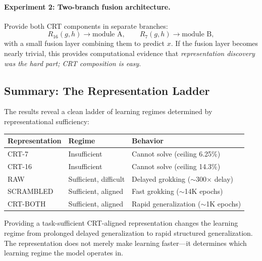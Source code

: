 \paragraph{Experiment 2: Two-branch fusion architecture.}
Provide both CRT components in separate branches:
\[
    R_{16}(g, h) \to \text{module A}, \qquad
    R_7(g, h) \to \text{module B},
\]
with a small fusion layer combining them to predict $x$. If the fusion layer becomes nearly trivial, this provides computational evidence that \emph{representation discovery was the hard part; CRT composition is easy}.


\subsection{Summary: The Representation Ladder}
\label{sec:repr_ladder}

The results reveal a clean ladder of learning regimes determined by representational sufficiency:

\begin{center}
\begin{tabular}{lll}
\toprule
Representation & Regime & Behavior \\
\midrule
CRT-7 & Insufficient & Cannot solve (ceiling 6.25\%) \\
CRT-16 & Insufficient & Cannot solve (ceiling 14.3\%) \\
RAW & Sufficient, difficult & Delayed grokking ($\sim$300$\times$ delay) \\
SCRAMBLED & Sufficient, aligned & Fast grokking ($\sim$14K epochs) \\
CRT-BOTH & Sufficient, aligned & Rapid generalization ($\sim$1K epochs) \\
\bottomrule
\end{tabular}
\end{center}

Providing a task-sufficient CRT-aligned representation changes the learning regime from prolonged delayed generalization to rapid structured generalization. The representation does not merely make learning faster---it determines which learning regime the model operates in.
